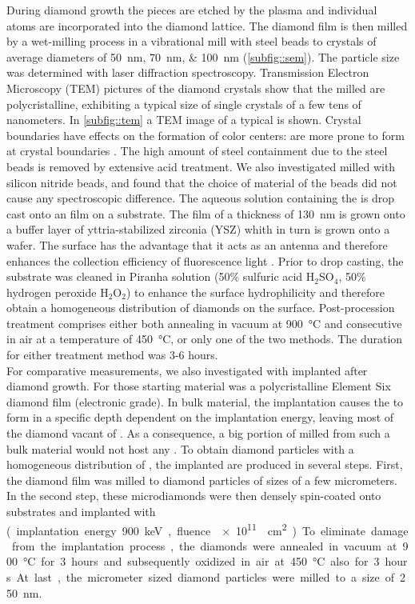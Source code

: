 	During diamond growth the \Si pieces are etched by the plasma and individual atoms are incorporated into the diamond lattice.
	The diamond film is then milled by a wet-milling process in a vibrational mill with steel beads to crystals of average diameters of \SIlist{50; 70; 100}{\nano\meter} (\autoref{subfig::sem}).
	The particle size was determined with laser diffraction spectroscopy.
	Transmission Electron Microscopy (TEM) pictures of the diamond crystals show that the milled \nds are polycristalline, exhibiting a typical size of single crystals of a few tens of nanometers.
	In \autoref{subfig::tem} a TEM image of a typical \nd is shown.
	Crystal boundaries have effects on the formation of color centers:
	\sivs are more prone to form at crystal boundaries \cite{Zapol2001}.
	The high amount of steel containment due to the steel beads is removed by extensive acid treatment.
	We also investigated \nds milled with silicon nitride beads, and found that the choice of material of the beads did not cause any spectroscopic difference.
	The aqueous solution containing the \nds is drop cast onto an \ir film on a \Si substrate.
	The \ir film of a thickness of \SI{130}{nm} is grown onto a buffer layer of yttria-stabilized zirconia (YSZ) whith in turn is grown onto a \Si wafer.
	The \ir surface has the advantage that it acts as an antenna and therefore enhances the collection efficiency of fluorescence light \cite{Neu2012a}.
	Prior to drop casting, the substrate was cleaned in Piranha solution (50\% sulfuric acid H$_2$SO$_4$, 50\% hydrogen peroxide H$_2$O$_2$) to enhance the surface hydrophilicity and therefore obtain a homogeneous distribution of diamonds on the surface.
	Post-procession treatment comprises either both annealing in vacuum at \SI{900}{\degreeCelsius} and consecutive \ox in air at a temperature of \SI{450}{\degreeCelsius}, or only one of the two methods.
	The duration for either treatment method was 3-6 hours.
	\\
	For comparative measurements, we also investigated \nds with \sivs implanted after diamond growth. 
	For those \nds starting material was a polycristalline Element Six diamond film (electronic grade).
	In bulk material, the implantation causes the \sivs to form in a specific depth dependent on the implantation energy, leaving most of the diamond vacant of \sivs.
	As a consequence, a big portion of  \nds milled from such a bulk material would not host any \sivs.
	To obtain diamond particles with a homogeneous distribution of \sivs, the implanted \nds are produced in several steps. 
	First, the diamond film was milled to diamond particles of sizes of a few micrometers.
	In the second step, these microdiamonds were then densely spin-coated onto \ir substrates and implanted with \si (implantation energy \SI{900}{keV}, fluence \SI{e11}{\per\centi\meter\squared}).
	To eliminate damage from the implantation process, the diamonds were annealed in vacuum at \SI{900}{\degreeCelsius} for 3 hours and subsequently oxidized in air at \SI{450}{\degreeCelsius} also for 3 hours.
	At last, the micrometer sized diamond particles were milled to a size of \SI{250}{\nano\meter}.


